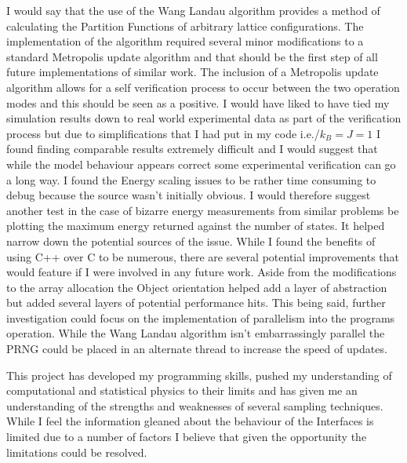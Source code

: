 I would say that the use of the Wang Landau algorithm provides a method of calculating the Partition Functions of arbitrary lattice configurations. 
The implementation of the algorithm required several minor modifications to a standard Metropolis update algorithm and that should be the first step of all future implementations of similar work.
The inclusion of a Metropolis update algorithm allows for a self verification process to occur between the two operation modes and this should be seen as a positive. 
I would have liked to have tied my simulation results down to real world experimental data as part of the verification process but due to simplifications that I had put in my code i.e./$k_B = J = 1$ I found finding comparable results extremely difficult and I would suggest that while the model behaviour appears correct some experimental verification can go a long way.
I found the Energy scaling issues to be rather time consuming to debug because the source wasn't initially obvious. I would therefore suggest another test in the case of bizarre energy measurements from similar problems be plotting the maximum energy returned against the number of states. It helped narrow down the potential sources of the issue. 
While I found the benefits of using C++ over C to be numerous, there are several potential improvements that would feature if I were involved in any future work. Aside from the modifications to the array allocation the Object orientation helped add a layer of abstraction but added several layers of potential performance hits. This being said, further investigation could focus on the implementation of parallelism into the programs operation. While the Wang Landau algorithm isn't embarrassingly parallel the PRNG could be placed in an alternate thread to increase the speed of updates.

This project has developed my programming skills, pushed my understanding of computational and statistical physics to their limits and has given me an understanding of the strengths and weaknesses of several sampling techniques. While I feel the information gleaned about the behaviour of the Interfaces is limited due to a number of factors I believe that given the opportunity the limitations could be resolved. 
